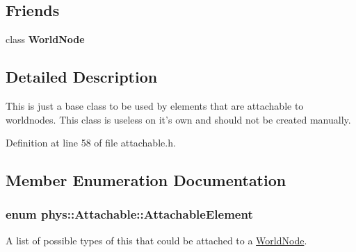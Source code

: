 \subsection*{Friends}
\begin{DoxyCompactItemize}
\item 
\hypertarget{classphys_1_1Attachable_a1cacd07efb11226da49a7c80569b18e8}{
class {\bfseries WorldNode}}
\label{df/dbd/classphys_1_1Attachable_a1cacd07efb11226da49a7c80569b18e8}

\end{DoxyCompactItemize}


\subsection{Detailed Description}
This is just a base class to be used by elements that are attachable to worldnodes. This class is useless on it's own and should not be created manually. 

Definition at line 58 of file attachable.h.



\subsection{Member Enumeration Documentation}
\hypertarget{classphys_1_1Attachable_acd1fca033e7cc0bb3024a92d466d213a}{
\subsubsection[{AttachableElement}]{\setlength{\rightskip}{0pt plus 5cm}enum {\bf phys::Attachable::AttachableElement}}}
\label{df/dbd/classphys_1_1Attachable_acd1fca033e7cc0bb3024a92d466d213a}


A list of possible types of this that could be attached to a \hyperlink{classphys_1_1WorldNode}{WorldNode}. 

